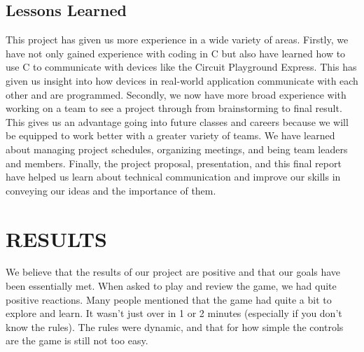 \documentclass[12pt]{article}
\begin{document}
\subsection{Lessons Learned}

This project has given us more experience in a wide variety of areas. Firstly, we have not only gained experience with coding in C but also have learned how to use C to communicate with devices like the Circuit Playground Express. This has given us insight into how devices in real-world application communicate with each other and are programmed. Secondly, we now have more broad experience with working on a team to see a project through from brainstorming to final result. This gives us an advantage going into future classes and careers because we will be equipped to work better with a greater variety of teams. We have learned about managing project schedules, organizing meetings, and being team leaders and members. Finally, the project proposal, presentation, and this final report have helped us learn about technical communication and improve our skills in conveying our ideas and the importance of them.

\section{RESULTS}

We believe that the results of our project are positive and that our goals have been essentially met. When asked to play and review the game, we had quite positive reactions.  Many people mentioned that the game had quite a bit to explore and learn.  It wasn't just over in 1 or 2 minutes (especially if you don't know the rules).  The rules were dynamic, and that for how simple the controls are the game is still not too easy.
\end{document}
